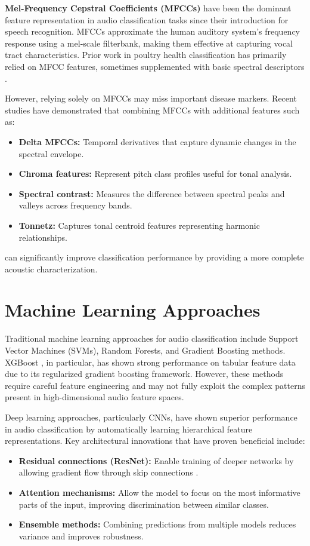\documentclass[12pt,a4paper]{report}
\begin{document}
\textbf{Mel-Frequency Cepstral Coefficients (MFCCs)} have been the dominant feature representation in audio classification tasks since their introduction for speech recognition. MFCCs approximate the human auditory system's frequency response using a mel-scale filterbank, making them effective at capturing vocal tract characteristics. Prior work in poultry health classification has primarily relied on MFCC features, sometimes supplemented with basic spectral descriptors \cite{datainbrief2023}.

However, relying solely on MFCCs may miss important disease markers. Recent studies have demonstrated that combining MFCCs with additional features such as:
\begin{itemize}
    \item \textbf{Delta MFCCs:} Temporal derivatives that capture dynamic changes in the spectral envelope.
    \item \textbf{Chroma features:} Represent pitch class profiles useful for tonal analysis.
    \item \textbf{Spectral contrast:} Measures the difference between spectral peaks and valleys across frequency bands.
    \item \textbf{Tonnetz:} Captures tonal centroid features representing harmonic relationships.
\end{itemize}
can significantly improve classification performance by providing a more complete acoustic characterization.

\section{Machine Learning Approaches}

Traditional machine learning approaches for audio classification include Support Vector Machines (SVMs), Random Forests, and Gradient Boosting methods. XGBoost \cite{chen2016xgboost}, in particular, has shown strong performance on tabular feature data due to its regularized gradient boosting framework. However, these methods require careful feature engineering and may not fully exploit the complex patterns present in high-dimensional audio feature spaces.

Deep learning approaches, particularly CNNs, have shown superior performance in audio classification by automatically learning hierarchical feature representations. Key architectural innovations that have proven beneficial include:
\begin{itemize}
    \item \textbf{Residual connections (ResNet):} Enable training of deeper networks by allowing gradient flow through skip connections \cite{he2016resnet}.
    \item \textbf{Attention mechanisms:} Allow the model to focus on the most informative parts of the input, improving discrimination between similar classes.
    \item \textbf{Ensemble methods:} Combining predictions from multiple models reduces variance and improves robustness.
\end{itemize}
\end{document}
